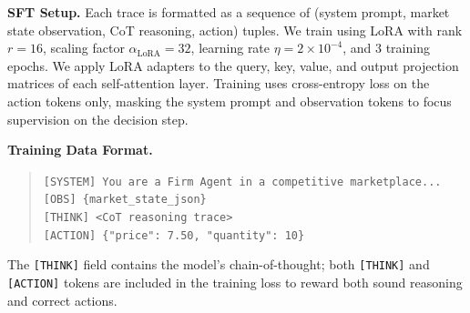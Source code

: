 \textbf{SFT Setup.}
Each trace is formatted as a sequence of (system prompt, market state observation, CoT reasoning, action) tuples. We train using LoRA \citep{hu2022lora} with rank $r=16$, scaling factor $\alpha_{\text{LoRA}}=32$, learning rate $\eta=2 \times 10^{-4}$, and 3 training epochs. We apply LoRA adapters to the query, key, value, and output projection matrices of each self-attention layer. Training uses cross-entropy loss on the action tokens only, masking the system prompt and observation tokens to focus supervision on the decision step.

\textbf{Training Data Format.}
\begin{quote}
\texttt{[SYSTEM] You are a Firm Agent in a competitive marketplace...}\\
\texttt{[OBS] \{market\_state\_json\}}\\
\texttt{[THINK] <CoT reasoning trace>}\\
\texttt{[ACTION] \{"price": 7.50, "quantity": 10\}}
\end{quote}
The \texttt{[THINK]} field contains the model's chain-of-thought; both \texttt{[THINK]} and \texttt{[ACTION]} tokens are included in the training loss to reward both sound reasoning and correct actions.
